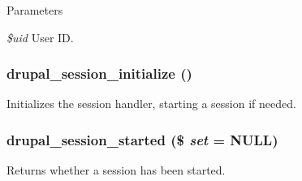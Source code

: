 \begin{DoxyParams}{Parameters}
\item[{\em \$uid}]User ID. \end{DoxyParams}
\hypertarget{session_8inc_a1ddf625160ae9e448b25ea74f9fa58d0}{
\subsubsection[{drupal\_\-session\_\-initialize}]{\setlength{\rightskip}{0pt plus 5cm}drupal\_\-session\_\-initialize ()}}
\label{session_8inc_a1ddf625160ae9e448b25ea74f9fa58d0}
Initializes the session handler, starting a session if needed. \hypertarget{session_8inc_a4de15350e0f9d1786d59da6ea7ea7171}{
\subsubsection[{drupal\_\-session\_\-started}]{\setlength{\rightskip}{0pt plus 5cm}drupal\_\-session\_\-started (\$ {\em set} = {\ttfamily NULL})}}
\label{session_8inc_a4de15350e0f9d1786d59da6ea7ea7171}
Returns whether a session has been started. 